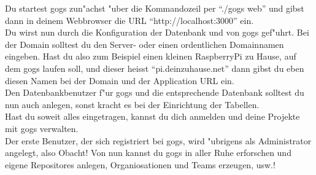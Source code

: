 \documentclass[german,a4paper]{report}
\begin{document}
Du startest gogs zun"achst "uber die Kommandozeil per ``./gogs web'' und gibst dann in
deinem Webbrowser die URL ``http://localhost:3000'' ein.\\
Du wirst nun durch die Konfiguration der Datenbank und von gogs gef"uhrt. Bei der Domain
solltest du den Server- oder einen ordentlichen Domainnamen eingeben. Hast du also zum
Beispiel einen kleinen RaspberryPi zu Hause, auf dem gogs laufen soll, und dieser heisst
``pi.deinzuhause.net'' dann gibst du eben diesen Namen bei der Domain und der Application
URL ein.\\
Den Datenbankbenutzer f"ur gogs und die entsprechende Datenbank solltest du nun auch
anlegen, sonst kracht es bei der Einrichtung der Tabellen.\\
Hast du soweit alles eingetragen, kannst du dich anmelden und deine Projekte mit gogs
verwalten.\\
Der erste Benutzer, der sich registriert bei gogs, wird "ubrigens als Administrator
angelegt, also Obacht! Von nun kannst du gogs in aller Ruhe erforschen und
eigene Repositores anlegen, Organiosationen und Teams erzeugen, usw.!
\end{document}
